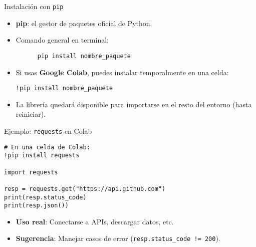 \documentclass[10pt]{beamer}
\begin{document}
\begin{frame}[fragile]{Instalación con \texttt{pip}}
  \begin{itemize}
    \item \textbf{pip}: el gestor de paquetes oficial de Python.
    \item Comando general en terminal:
    \begin{verbatim}
      pip install nombre_paquete
    \end{verbatim}
    \item Si usas \textbf{Google Colab}, puedes instalar temporalmente en una celda:
    \begin{verbatim}
!pip install nombre_paquete
    \end{verbatim}
    \item La librería quedará disponible para importarse en el resto del entorno (hasta reiniciar).
  \end{itemize}
\end{frame}

\begin{frame}[fragile]{Ejemplo: \texttt{requests} en Colab}
\begin{verbatim}
# En una celda de Colab:
!pip install requests

import requests

resp = requests.get("https://api.github.com")
print(resp.status_code)
print(resp.json())
\end{verbatim}
\begin{itemize}
  \item \textbf{Uso real}: Conectarse a APIs, descargar datos, etc.
  \item \textbf{Sugerencia}: Manejar casos de error (\texttt{resp.status\_code != 200}).
\end{itemize}
\end{frame}
\end{document}
